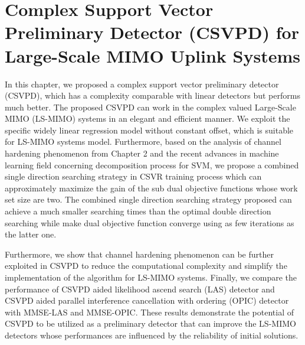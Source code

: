 \resetdatestamp



\chapter{Complex Support Vector Preliminary Detector (CSVPD) for Large-Scale MIMO Uplink Systems}
In this chapter, we proposed a complex support vector preliminary detector (CSVPD), which has a complexity  comparable with linear detectors but performs much better. The proposed CSVPD can work in the complex valued Large-Scale MIMO (LS-MIMO) systems in an elegant and efficient manner. We exploit the specific widely linear regression model without constant offset, which is suitable for LS-MIMO systems model. Furthermore, based on the analysis of channel hardening phenomenon from Chapter 2 and the recent advances in machine learning field concerning decomposition process for SVM\cite{steinwart2011training}, we propose a combined single direction searching strategy in CSVR training process which can approximately maximize the gain of the sub dual objective functions whose work set size are two. The combined single direction searching strategy proposed can achieve a much smaller searching times than the optimal double direction searching while make dual objective function converge using as few iterations as the latter one. 
  
  Furthermore, we show that channel hardening phenomenon can be further exploited in CSVPD to reduce the computational complexity and simplify the implementation of the algorithm for LS-MIMO systems. Finally, we compare the performance of CSVPD aided likelihood ascend search (LAS) detector and CSVPD aided parallel interference cancellation with ordering (OPIC) detector with MMSE-LAS and MMSE-OPIC. These results demonstrate the potential of CSVPD to be utilized as a preliminary detector that can improve the LS-MIMO detectors whose performances are influenced by the reliability of initial solutions.  


